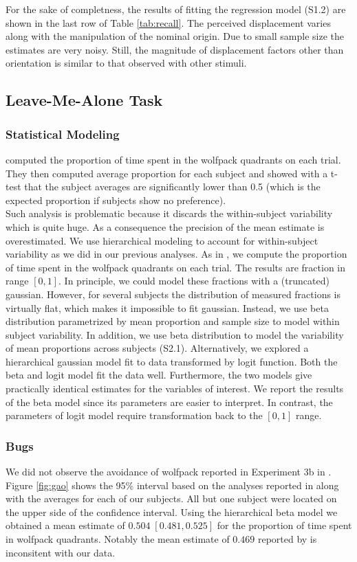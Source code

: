 \documentclass[10pt]{article}
\begin{document}
For the sake of completness, the results of fitting the regression model (S1.2) are shown in the last row of Table \ref{tab:recall}. 
The perceived displacement varies along with the manipulation of the nominal origin.
Due to small sample size the estimates are very noisy. 
Still, the magnitude of displacement factors other than orientation is similar to that observed with other stimuli.

\subsection*{Leave-Me-Alone Task}
\subsubsection*{Statistical Modeling}
\cite{gao10} computed the proportion of time spent in the wolfpack quadrants on each trial. 
They then computed average proportion for each subject and showed with a t-test that the subject averages are significantly lower than 0.5 (which is the expected proportion if subjects show no preference).\\
Such analysis is problematic because it discards the within-subject variability which is quite huge. 
As a consequence the precision of the mean estimate is overestimated. We use hierarchical modeling to account for within-subject variability as we did in our previous analyses.
As in \cite{gao10}, we compute the proportion of time spent in the wolfpack quadrants on each trial.
The results are fraction in range $[0,1]$.
In principle, we could model these fractions with a (truncated) gaussian. 
However, for several subjects the distribution of measured fractions is virtually flat, which makes it impossible to fit gaussian. 
Instead, we use beta distribution parametrized by mean proportion and sample size to model within subject variability. 
In addition, we use beta distribution to model the variability of mean proportions across subjects (S2.1). 
Alternatively, we explored a hierarchical gaussian model fit to data transformed by logit function. 
Both the beta and logit model fit the data well. 
Furthermore, the two models give practically identical estimates for the variables of interest. 
We report the results of the beta model since its parameters are easier to interpret. 
In contrast, the parameters of logit model require transformation back to the $[0,1]$ range.\\

\subsubsection*{Bugs}
We did not observe the avoidance of wolfpack reported in Experiment 3b in \cite{gao10}. 
Figure \ref{fig:gao} shows the 95\% interval based on the analyses reported in \cite{gao10} along with the averages for each of our subjects.
All but one subject were located on the upper side of the confidence interval. 
Using the hierarchical beta model we obtained a mean estimate of $0.504 \; [0.481,0.525] $ for the proportion of time spent in wolfpack quadrants. 
Notably the mean estimate of $0.469$ reported by \cite{gao10} is inconsitent with our data.\\
\end{document}

